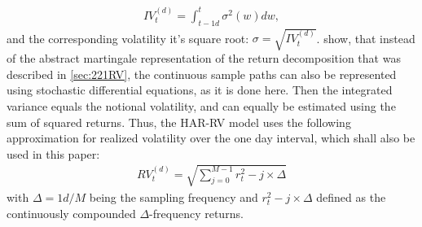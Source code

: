 \begin{align}
IV_{t}^{(d)} =  \int_{t-1d}^{t} \sigma^{2}(w)dw, 
\end{align}
and the corresponding volatility it's square root: $\sigma = \sqrt{IV_{t}^{(d)}}$.
\textcite{andersen2001} show, that instead of the abstract martingale representation of the return decomposition that was described in \ref{sec:221RV}, the continuous sample paths can also be represented using stochastic differential equations, as it is done here. Then the integrated variance equals the notional volatility, and can equally be estimated using the sum of squared returns. Thus, the HAR-RV model uses the following approximation for realized volatility over the one day interval, which shall also be used in this paper:
\begin{align}
RV_{t}^{(d)} = \sqrt{\sum_{j=0}^{M-1} r^{2}_t-j \times \Delta}
\end{align}
with $\Delta = 1d/M$ being the sampling frequency and $r^{2}_t-j \times \Delta$ defined as the continuously compounded $\Delta$-frequency returns. \\
